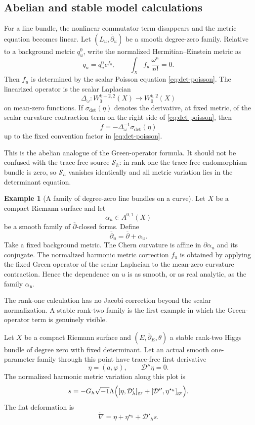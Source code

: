 \documentclass[11pt,reqno]{amsart}
\theoremstyle{definition}
\newtheorem{example}[theorem]{Example}
\theoremstyle{remark}
\newcommand{\cD}{\mathcal D}
\newcommand{\cS}{\mathcal S}
\newcommand{\ddbar}{\overline\partial}
\begin{document}
\subsection{Abelian and stable model calculations}

For a line bundle, the nonlinear commutator term disappears and the metric equation becomes linear.  Let $(L_u,\ddbar_u)$ be a smooth degree-zero family.  Relative to a background metric $q^0_u$, write the normalized Hermitian--Einstein metric as
\[
  q_u=q^0_ue^{f_u},
  \qquad
  \int_X f_u\,\frac{\omega^n}{n!}=0.
\]
Then $f_u$ is determined by the scalar Poisson equation \eqref{eq:det-poisson}.  The linearized operator is the scalar Laplacian
\[
  \Delta_\omega:W^{k+2,2}_0(X)\longrightarrow W^{k,2}_0(X)
\]
on mean-zero functions.  If $\sigma_{\det}(\eta)$ denotes the derivative, at fixed metric, of the scalar curvature-contraction term on the right side of \eqref{eq:det-poisson}, then
\[
  \dot f=-\Delta_\omega^{-1}\sigma_{\det}(\eta)
\]
up to the fixed convention factor in \eqref{eq:det-poisson}.

This is the abelian analogue of the Green-operator formula.  It should not be confused with the trace-free source $\cS_h$: in rank one the trace-free endomorphism bundle is zero, so $\cS_h$ vanishes identically and all metric variation lies in the determinant equation.

\begin{example}[A family of degree-zero line bundles on a curve]\label{ex:line-curve}
Let $X$ be a compact Riemann surface and let
\[
  \alpha_u\in A^{0,1}(X)
\]
be a smooth family of $\ddbar$-closed forms.  Define
\[
  \ddbar_u=\ddbar+\alpha_u.
\]
Take a fixed background metric.  The Chern curvature is affine in $\partial\alpha_u$ and its conjugate.  The normalized harmonic metric correction $f_u$ is obtained by applying the fixed Green operator of the scalar Laplacian to the mean-zero curvature contraction.  Hence the dependence on $u$ is as smooth, or as real analytic, as the family $\alpha_u$.
\end{example}


The rank-one calculation has no Jacobi correction beyond the scalar normalization.  A stable rank-two family is the first example in which the Green-operator term is genuinely visible.


Let $X$ be a compact Riemann surface and $(E,\ddbar_E,\theta)$ a stable rank-two Higgs bundle of degree zero with fixed determinant.  Let an actual smooth one-parameter family through this point have trace-free first derivative
\[
  \eta=(a,\varphi),
  \qquad
  \cD''\eta=0.
\]
The normalized harmonic metric variation along this plot is
\begin{equation}\label{eq:rank2-s}
  s=-G_h\sqrt{-1}\Lambda\Bigl(
  [\eta,\cD'_h]_{\mathrm{gr}}
  +[\cD'',\eta^{\star_h}]_{\mathrm{gr}}
  \Bigr).
\end{equation}
The flat deformation is
\begin{equation}\label{eq:rank2-flat}
  \dot\nabla
  =\eta+\eta^{\star_h}+\cD'_hs.
\end{equation}
\end{document}
